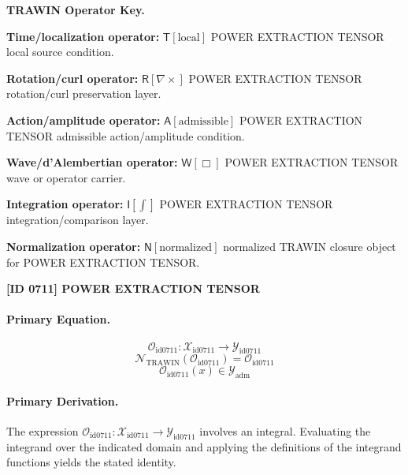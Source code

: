 \par\vspace{0.45\baselineskip}
\noindent\begin{minipage}[t]{\linewidth}
\begingroup
\small
\raggedright
\textbf{TRAWIN Operator Key.}\par
\noindent\textbf{Time/localization operator:} $\mathsf{T}\!\left[\mathrm{local}\right]$ POWER EXTRACTION TENSOR local source condition.\par
\noindent\textbf{Rotation/curl operator:} $\mathsf{R}\!\left[\nabla\times\right]$ POWER EXTRACTION TENSOR rotation/curl preservation layer.\par
\noindent\textbf{Action/amplitude operator:} $\mathsf{A}\!\left[\mathrm{admissible}\right]$ POWER EXTRACTION TENSOR admissible action/amplitude condition.\par
\noindent\textbf{Wave/d'Alembertian operator:} $\mathsf{W}\!\left[\Box\right]$ POWER EXTRACTION TENSOR wave or operator carrier.\par
\noindent\textbf{Integration operator:} $\mathsf{I}\!\left[\int\right]$ POWER EXTRACTION TENSOR integration/comparison layer.\par
\noindent\textbf{Normalization operator:} $\mathsf{N}\!\left[\mathrm{normalized}\right]$ normalized TRAWIN closure object for POWER EXTRACTION TENSOR.\par
\endgroup
\end{minipage}

\clearpage
\noindent\textbf{[ID 0711] POWER EXTRACTION TENSOR}\par
\vspace{0.35em}
\paragraph{Primary Equation.}
\[
\mathcal{O}_{\mathrm{id0711}}:\mathcal{X}_{\mathrm{id0711}}\longrightarrow\mathcal{Y}_{\mathrm{id0711}}
\]
\[
\mathcal{N}_{\mathrm{TRAWIN}}(\mathcal{O}_{\mathrm{id0711}})=\mathcal{O}_{\mathrm{id0711}}
\]
\[
\mathcal{O}_{\mathrm{id0711}}(x)\in\mathcal{Y}_{\mathrm{adm}}
\]

\paragraph{Primary Derivation.}
The expression \( \mathcal{O}_{\mathrm{id0711}}:\mathcal{X}_{\mathrm{id0711}}\longrightarrow\mathcal{Y}_{\mathrm{id0711}} \) involves an integral. Evaluating the integrand over the indicated domain and applying the definitions of the integrand functions yields the stated identity.
